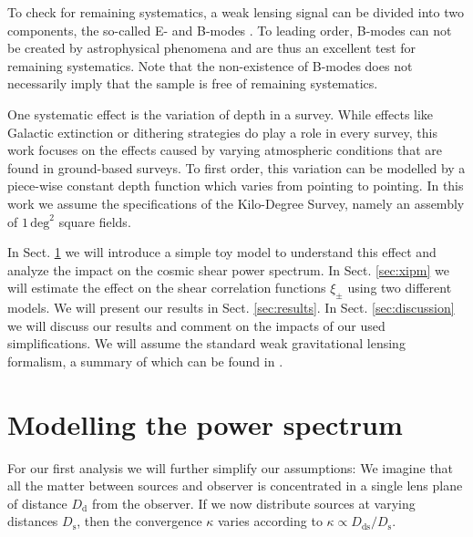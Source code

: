 \documentclass[referee]{aa} %
\renewcommand{\[}{\begin{equation}}
\renewcommand{\]}{\end{equation}}
\renewcommand{\rm}{\mathrm}
\begin{document}
To check for remaining systematics, a weak lensing signal can be divided into two components, the so-called E- and B-modes \citep{2002ApJ...568...20C,2002A&A...389..729S}. To leading order, B-modes can not be created by astrophysical phenomena and are thus an excellent test for remaining systematics. Note that the non-existence of B-modes does not necessarily imply that the sample is free of remaining systematics.

One systematic effect is the variation of depth in a survey. While effects like Galactic extinction or dithering strategies do play a role in every survey, this work focuses on the effects caused by varying atmospheric conditions that are found in ground-based surveys. To first order, this variation can be modelled by a piece-wise constant depth function which varies from pointing to pointing. In this work we assume the specifications of the Kilo-Degree Survey, namely an assembly of $1\,\text{deg}^2$ square fields. 

In Sect. \ref{sec:modelling_single_lens} we will introduce a simple toy model to understand this effect and analyze the impact on the cosmic shear power spectrum. In Sect. \ref{sec:xipm} we will estimate the effect on the shear correlation functions $\xi_\pm$ using two different models. We will present our results in Sect. \ref{sec:results}. In Sect. \ref{sec:discussion} we will discuss our results and comment on the impacts of our used simplifications. We will assume the standard weak gravitational lensing formalism, a summary of which can be found in \citet{2001PhR...340..291B}.


\section{Modelling the power spectrum}
\label{sec:modelling_single_lens}
For our first analysis we will further simplify our assumptions: We imagine that all the matter between sources and observer is concentrated in a single lens plane of distance $D_{\rm d}$ from the observer. If we now distribute sources at varying distances $D_{\rm s}$, then the convergence $\kappa$ varies according to $\kappa \propto D_{\rm{ds}}/D_{\rm s}$. 
\end{document}
